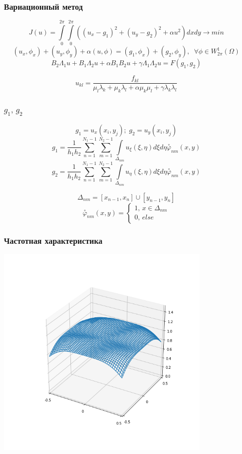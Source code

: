 \documentclass[11pt]{beamer}
\begin{document}
\begin{frame}
\frametitle{Вариационный метод}
 $$J(u) = \int \limits_0^{2\pi} \int \limits_0^{2\pi} ((u_x - g_1)^2 + (u_y-g_2)^2 + \alpha u^2 )dxdy \rightarrow min$$
 $$(u_x, \phi_x) + (u_y,\phi_y) + \alpha(u, \phi) = (g_1, \phi_x) + (g_2, \phi_y),\;\;\forall\phi \in W_{2\pi}^{1}(\Omega)$$
 $$B_2 \Lambda_1 u + B_1 \Lambda_2 u + \alpha B_1 B_2 u + \gamma\Lambda_1\Lambda_2u = F(g_1,g_2)$$
 
$$u_{kl} = \frac{f_{kl}}{\mu_l \lambda_k + \mu_k \lambda_l + \alpha \mu_k \mu_l + \gamma \lambda_k \lambda_l}$$
\end{frame}

\begin{frame}
\frametitle{$g_1,\,g_2$}
$$g_1 = u_x(x_i,y_j);\; g_2 = u_y(x_i,y_j)$$
$$
g_1 = \frac{1}{h_1h_2} \sum \limits_{n=1}^{N_1 - 1} \sum \limits_{m=1}^{N_2 - 1} \int \limits _{\Delta_{nm}} u_\xi(\xi,\eta) d\xi d\eta\overset{\circ}{\varphi}_{nm}(x,y)
$$
$$
g_2 = \frac{1}{h_1h_2} \sum \limits_{n=1}^{N_1 - 1} \sum \limits_{m=1}^{N_2 - 1} \int \limits _{\Delta_{nm}} u_\eta(\xi,\eta) d\xi d\eta \overset{\circ}{\varphi}_{nm}(x,y)
$$

$$
\Delta_{nm} = [x_{n-1}, x_n] \cup [y_{n-1}, y_n]
$$
$$
\overset{\circ}{\varphi}_{nm}(x,y) = \begin{cases} 1, \, x \in \Delta_{nm} \\ 0, \, else\end{cases}
$$

\end{frame}

\begin{frame}
\frametitle{Частотная характеристика}
\includegraphics[width=0.8\textwidth]{3dcont.png}
\end{frame}
\end{document}
